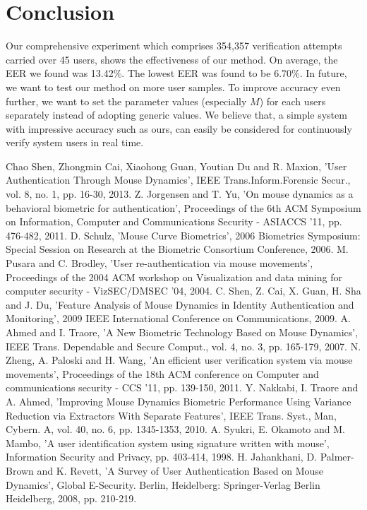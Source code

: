 \documentclass[conference]{IEEEtran}
\begin{document}
\section{Conclusion}

Our comprehensive experiment which comprises 354,357 verification attempts carried over 45 users, shows the effectiveness of our method. On average, the EER we found was 13.42\%. The lowest EER was found to be 6.70\%. In future, we want to test our method on more user samples. To improve accuracy even further, we want to set the parameter values (especially $M$) for each users separately instead of adopting generic values. We believe that, a simple system with impressive accuracy such as ours, can easily be considered for continuously verify system users in real time.    

\begin{thebibliography}{100} %


 Chao Shen, Zhongmin Cai, Xiaohong Guan, Youtian Du and R. Maxion, 'User Authentication Through Mouse Dynamics', IEEE Trans.Inform.Forensic Secur., vol. 8, no. 1, pp. 16-30, 2013.
 Z. Jorgensen and T. Yu, 'On mouse dynamics as a behavioral biometric for authentication', Proceedings of the 6th ACM Symposium on Information, Computer and Communications Security - ASIACCS '11, pp. 476-482, 2011.
D. Schulz, 'Mouse Curve Biometrics', 2006 Biometrics Symposium: Special Session on Research at the Biometric Consortium Conference, 2006.
M. Pusara and C. Brodley, 'User re-authentication via mouse movements', Proceedings of the 2004 ACM workshop on Visualization and data mining for computer security - VizSEC/DMSEC '04, 2004.
C. Shen, Z. Cai, X. Guan, H. Sha and J. Du, 'Feature Analysis of Mouse Dynamics in Identity Authentication and Monitoring', 2009 IEEE International Conference on Communications, 2009.
 A. Ahmed and I. Traore, 'A New Biometric Technology Based on Mouse Dynamics', IEEE Trans. Dependable and Secure Comput., vol. 4, no. 3, pp. 165-179, 2007.
N. Zheng, A. Paloski and H. Wang, 'An efficient user verification system via mouse movements', Proceedings of the 18th ACM conference on Computer and communications security - CCS '11, pp. 139-150, 2011.
Y. Nakkabi, I. Traore and A. Ahmed, 'Improving Mouse Dynamics Biometric Performance Using Variance Reduction via Extractors With Separate Features', IEEE Trans. Syst., Man, Cybern. A, vol. 40, no. 6, pp. 1345-1353, 2010.
A. Syukri, E. Okamoto and M. Mambo, 'A user identification system using signature written with mouse', Information Security and Privacy, pp. 403-414, 1998.
 H. Jahankhani, D. Palmer-Brown and K. Revett, 'A Survey of User Authentication Based on Mouse Dynamics', Global E-Security. Berlin, Heidelberg: Springer-Verlag Berlin Heidelberg, 2008, pp. 210-219.



\end{thebibliography}
\end{document}
